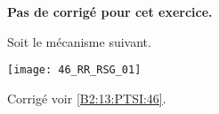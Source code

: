 \normalfalse \difficiletrue \tdifficilefalse
\correctionfalse


\setcounter{question}{0}
\ifcorrection
\else
\textbf{Pas de corrigé pour cet exercice.}
\fi

\ifprof
\else
Soit le mécanisme suivant.
\begin{center}
\texttt{[image: 46\_RR\_RSG\_01]}
\end{center}
\fi





\ifprof
\else

\footnotesize

\normalsize


\begin{flushright}
\footnotesize{Corrigé  voir \ref{B2:13:PTSI:46}.}
\end{flushright}%
\fi